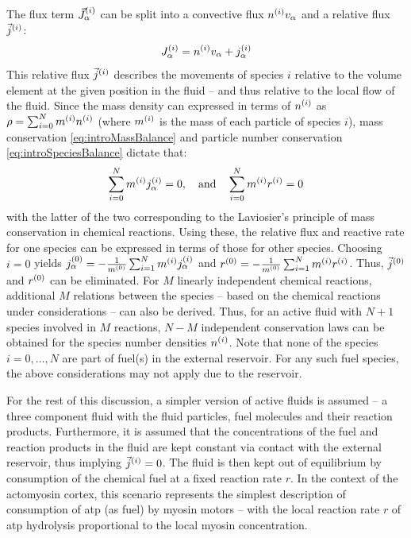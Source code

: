 The flux term $\vec{J}^{(i)}_\alpha$ can be split into a convective flux $n^{(i)}v_\alpha$ and a relative flux $\vec{j}^{(i)}$:
\begin{equation}\label{eq:introRelativeSpeciesFlux}
    J^{(i)}_\alpha = n^{(i)}v_\alpha + j^{(i)}_\alpha
\end{equation}
This relative flux $\vec{j}^{(i)}$ describes the movements of species $i$ relative to the volume element at the given position in the fluid -- and thus relative to the local flow of the fluid. Since the mass density can expressed in terms of $n^{(i)}$ as $\rho = \sum_{i=0}^N m^{(i)} n^{(i)}$ (where $m^{(i)}$ is the mass of each particle of species $i$), mass conservation \autoref{eq:introMassBalance} and particle number conservation \autoref{eq:introSpeciesBalance} dictate that:
\begin{equation*}
    \sum_{i=0}^N m^{(i)} j^{(i)}_\alpha = 0, \quad \textrm{and} \quad \sum_{i=0}^N m^{(i)} r^{(i)} = 0
\end{equation*}
with the latter of the two corresponding to the Laviosier's principle of mass conservation in chemical reactions. Using these, the relative flux and reactive rate for one species can be expressed in terms of those for other species. Choosing $i = 0$ yields $j^{(0)}_\alpha = -\frac{1}{m^{(0)}}\sum_{i=1}^Nm^{(i)}j^{(i)}_\alpha$ and $r^{(0)} = -\frac{1}{m^{(0)}}\sum_{i=1}^Nm^{(i)}r^{(i)}$. Thus, $\vec{j}^{(0)}$ and $r^{(0)}$ can be eliminated. For $M$ linearly independent chemical reactions, additional $M$ relations between the species -- based on the chemical reactions under considerations -- can also be derived. Thus, for an active fluid with $N+1$ species involved in $M$ reactions, $N - M$ independent conservation laws can be obtained for the species number densities $n^{(i)}$. Note that none of the species $i = 0,\ldots,N$ are part of fuel(s) in the external reservoir. For any such fuel species, the above considerations may not apply due to the reservoir. 

For the rest of this discussion, a simpler version of active fluids is assumed -- a three component fluid with the fluid particles, fuel molecules and their reaction products. Furthermore, it is assumed that the concentrations of the fuel and reaction products in the fluid are kept constant via contact with the external reservoir, thus implying $\vec{j}^{(i)} = 0$. The fluid is then kept out of equilibrium by consumption of the chemical fuel at a fixed reaction rate $r$. In the context of the actomyosin cortex, this scenario represents the simplest description of consumption of \ac{atp} (as fuel) by myosin motors -- with the local reaction rate $r$ of \ac{atp} hydrolysis proportional to the local myosin concentration.

